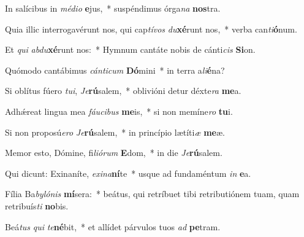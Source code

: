 \item In salícibus in \textit{mé}\textit{di}\textit{o} \textbf{e}jus,~* suspéndimus órga\textit{na} \textbf{nos}tra.
\item Quia illic interrogavérunt nos, qui cap\textit{tí}\textit{vos} \textit{du}\textbf{xé}runt nos,~* verba can\textit{ti}\textbf{ó}num.
\item Et \textit{qui} \textit{ab}\textit{du}\textbf{xé}runt nos:~* Hymnum cantáte nobis de cánti\textit{cis} \textbf{Si}on.
\item Quómodo cantábimus \textit{cán}\textit{ti}\textit{cum} \textbf{Dó}mini~* in terra a\textit{li}\textbf{é}na?
\item Si oblítus fúero \textit{tu}\textit{i}, \textit{Je}\textbf{rú}salem,~* oblivióni detur déxte\textit{ra} \textbf{me}a.
\item Adhǽreat lingua mea \textit{fáu}\textit{ci}\textit{bus} \textbf{me}is,~* si non memíne\textit{ro} \textbf{tu}i.
\item Si non proposú\textit{e}\textit{ro} \textit{Je}\textbf{rú}salem,~* in princípio lætíti\textit{æ} \textbf{me}æ.
\item Memor esto, Dómine, fi\textit{li}\textit{ó}\textit{rum} \textbf{E}dom,~* in die \textit{Je}\textbf{rú}salem.
\item Qui dicunt: Exinaníte, \textit{ex}\textit{i}\textit{na}\textbf{ní}te~* usque ad fundaméntum \textit{in} \textbf{e}a.
\item Fília Ba\textit{by}\textit{ló}\textit{nis} \textbf{mí}sera:~* beátus, qui retríbuet tibi retributiónem tuam, quam retribuís\textit{ti} \textbf{no}bis.
\item Beá\textit{tus} \textit{qui} \textit{te}\textbf{né}bit,~* et allídet párvulos tuos \textit{ad} \textbf{pe}tram.
